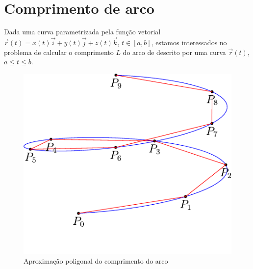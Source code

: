 \section{Comprimento de arco}
Dada uma curva parametrizada pela função vetorial $\vec{r}(t)=x(t)\vec{i}+y(t)\vec{j}+z(t)\vec{k}$, $t\in[a,b]$, estamos interessados no problema de calcular o comprimento $L$ do arco de descrito por uma curva $\vec{r}(t)$, $a\leq t\leq b$.

\begin{figure}
\centering
    \includegraphics{./cap_curvas/figs/helice_retificacao}
\caption{Aproximação poligonal do comprimento do arco}\label{fig_compr_arc}
\end{figure}



